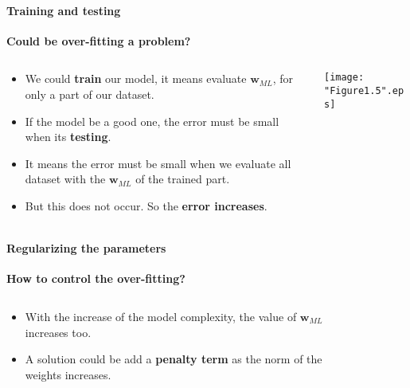 \begin{frame}{\insertsubsection}
	\framesubtitle{Training and testing}
	\textcolor{UniGold}{\textbf{Could be over-fitting a problem?}}
	\begin{columns}
		\begin{column}{0.475\textwidth}
			\begin{itemize}	
			\item We could \textcolor{UniOrange}{\textbf{train}} our model, it means evaluate $\mathbf{w}_{ML}$, for only a part of our dataset.
			\item If the model be a good one, the error must be small when its \textcolor{UniOrange}{\textbf{testing}}.
			\item It means the error must be small when we evaluate all dataset with the $\mathbf{w}_{ML}$ of the trained part.
			\item But this does not occur. So the \textcolor{UniOrange}{\textbf{error increases}}.
			\end{itemize}
		\end{column}
		\begin{column}{0.475\textwidth}  %
			\begin{center}
			\centering
			\label{fig:Erms}
			\texttt{[image: "Figure1.5".eps]}
			\end{center}
		\end{column}
	\end{columns}		
	\end{frame}

\begin{frame}{\insertsubsection}
	\framesubtitle{Regularizing the parameters}
	\textcolor{UniGold}{\textbf{How to control the over-fitting?}}
	\begin{columns}
		\begin{column}{0.475\textwidth}
			\begin{itemize}	
			\item With the increase of the model complexity, the value of $\mathbf{w}_{ML}$ increases too.
			\item A solution could be add a \textcolor{UniOrange}{\textbf{penalty term}} as the norm of the weights increases.
			\end{itemize}
		\end{column}
		\begin{column}{0.475\textwidth}  %
			\centering
			\begin{figure}
				\setlength\fwidth{0.075\textwidth}
				
			\end{figure}
		\end{column}
	\end{columns}
\end{frame}


